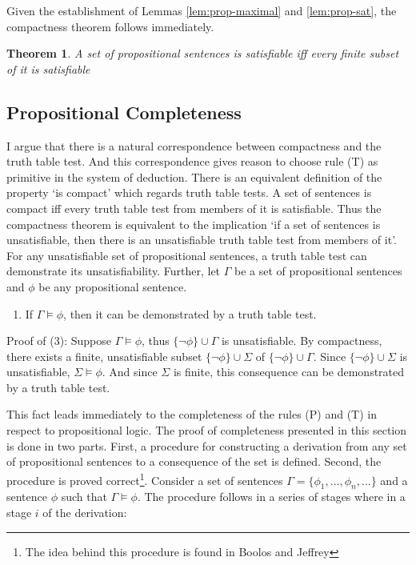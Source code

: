 \documentclass[12pt]{article}
\newtheorem{theorem}{Theorem}[section]
\theoremstyle{definition}
\theoremstyle{remark}
\begin{document}
Given the establishment of Lemmas \ref{lem:prop-maximal} and \ref{lem:prop-sat}, the compactness theorem follows immediately.

\begin{theorem}{}
	A set of propositional sentences is satisfiable iff every finite subset of it is satisfiable
\end{theorem}

\subsection{Propositional Completeness}

I argue that there is a natural correspondence between compactness and the truth table test. And this correspondence gives reason to choose rule (T) as primitive in the system of deduction. There is an equivalent definition of the property `is compact' which regards truth table tests. A set of sentences is compact iff every truth table test from members of it is satisfiable. Thus the compactness theorem is equivalent to the implication `if a set of sentences is unsatisfiable, then there is an unsatisfiable truth table test from members of it'. For any unsatisfiable set of propositional sentences, a truth table test can demonstrate its unsatisfiability. Further, let $\Gamma$ be a set of propositional sentences and $\phi$ be any propositional sentence.

\begin{enumerate}
	\item[(3)] If $\Gamma \models \phi$, then it can be demonstrated by a truth table test.
\end{enumerate}

Proof of (3): Suppose $\Gamma \models \phi$, thus $\{ \neg\phi \} \cup \Gamma$ is unsatisfiable. By compactness, there exists a finite, unsatisfiable subset $\{ \neg\phi \} \cup \Sigma$ of $\{ \neg\phi \} \cup \Gamma$. Since $\{ \neg\phi \} \cup \Sigma$ is unsatisfiable, $\Sigma \models \phi$. And since $\Sigma$ is finite, this consequence can be demonstrated by a truth table test.

This fact leads immediately to the completeness of the rules (P) and (T) in respect to propositional logic. The proof of completeness presented in this section is done in two parts. First, a procedure for constructing a derivation from any set of propositional sentences to a consequence of the set is defined. Second, the procedure is proved correct\footnote{The idea behind this procedure is found in Boolos and Jeffrey\cite{boolosjeffrey}}. Consider a set of sentences $\Gamma = \{ \phi_1, ..., \phi_n, ... \}$ and a sentence $\phi$ such that $\Gamma \models \phi$. The procedure follows in a series of stages where in a stage $i$ of the derivation: 
\end{document}
